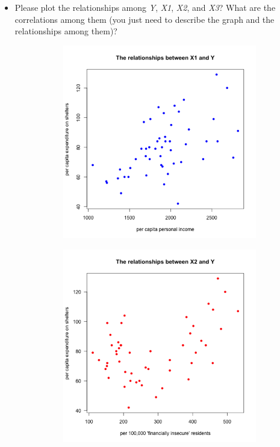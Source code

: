 \documentclass[12pt,letterpaper]{article}
\begin{document}
\begin{itemize}

\item
Please plot the relationships among \emph{Y}, \emph{X1}, \emph{X2}, and \emph{X3}? What are the correlations among them (you just need to describe the graph and the relationships among them)?


\begin{figure}[h!]
	\centering
	\begin{subfigure}[b]{0.45\textwidth}
		\includegraphics[width=\textwidth]{PS01_Q2_scplot1.png}
		\label{fig:image1}
	\end{subfigure}
	\hspace{.5cm} 
	\begin{subfigure}[b]{0.45\textwidth}
		\includegraphics[width=\textwidth]{PS01_Q2_scplot2.png}

\end{subfigure}
\end{figure}
\end{itemize}
\end{document}
